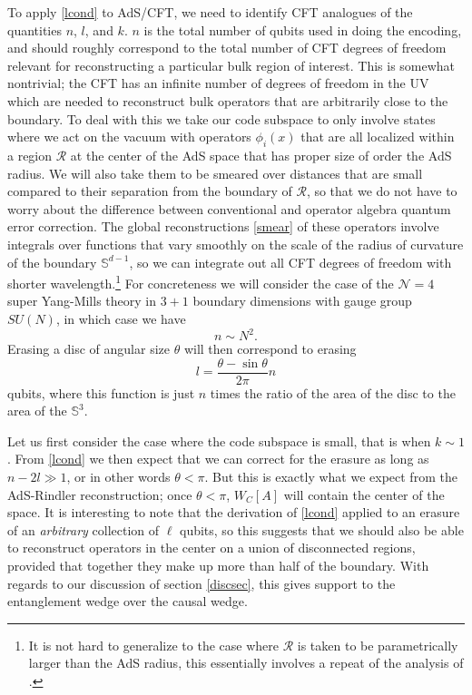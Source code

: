 \documentclass[12pt]{article}
\newcommand{\be}{\begin{equation}}
\newcommand{\ee}{\end{equation}}
\begin{document}
To apply \eqref{lcond} to AdS/CFT, we need to identify CFT analogues of the quantities $n$, $l$, and $k$.  $n$ is the total number of qubits used in doing the encoding, and should roughly correspond to the total number of CFT degrees of freedom relevant for reconstructing a particular bulk region of interest.  This is somewhat nontrivial; the CFT has an infinite number of degrees of freedom in the UV which are needed to reconstruct bulk operators that are arbitrarily close to the boundary.  To deal with this we take our code subspace to only involve states where we act on the vacuum with operators $\phi_i(x)$ that are all localized within a region $\mathcal{R}$ at the center of the AdS space that has proper size of order the AdS radius.  We will also take them to be smeared over distances that are small compared to their separation from the boundary of $\mathcal{R}$, so that we do not have to worry about the difference between conventional and operator algebra quantum error correction.  The global reconstructions \eqref{smear} of these operators involve integrals over functions that vary smoothly on the scale of the radius of curvature of the boundary $\mathbb{S}^{d-1}$, so we can integrate out all CFT degrees of freedom with shorter wavelength.\footnote{It is not hard to generalize to the case where $\mathcal{R}$ is taken to be parametrically larger than the AdS radius, this essentially involves a repeat of the analysis of \cite{Susskind:1998dq}.}  For concreteness we will consider the case of the $\mathcal{N}=4$ super Yang-Mills theory in $3+1$ boundary dimensions with gauge group $SU(N)$, in which case we have
\be
n\sim N^2.
\ee
Erasing a disc of angular size $\theta$ will then correspond to erasing 
\be
l=\frac{\theta- \sin \theta}{2\pi} n
\ee
qubits, where this function is just $n$ times the ratio of the area of the disc to the area of the $\mathbb{S}^3$.    

Let us first consider the case where the code subspace is small, that is when $k\sim 1$.  From \eqref{lcond} we then expect that we can correct for the erasure as long as $n-2l \gg 1$, or in other words $\theta<\pi$.  But this is exactly what we expect from the AdS-Rindler reconstruction; once $\theta<\pi$, $W_C[A]$ will contain the center of the space.  It is interesting to note that the derivation of \eqref{lcond} applied to an erasure of an \textit{arbitrary} collection of $\ell$ qubits, so this suggests that we should also be able to reconstruct operators in the center on a union of disconnected regions, provided that together they make up more than half of the boundary.  With regards to our discussion of section \ref{discsec}, this gives support to the entanglement wedge over the causal wedge.
\end{document}
